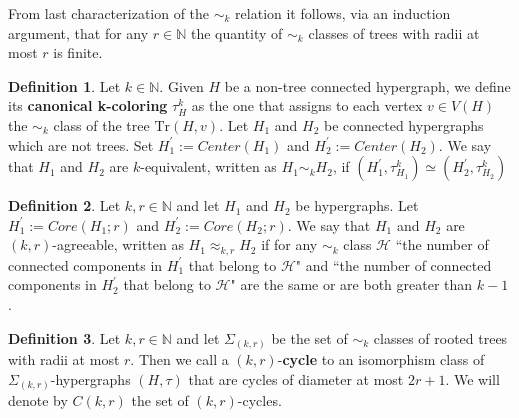 \documentclass[12pt,notitlepage,a4paper]{article}
\theoremstyle{definition}
\newtheorem{definition}{Definition}[section]
\newcommand{\N}{\mathbb{N}}
\newcommand{\Tr}{\mathrm{Tr}}
\begin{document}
From last characterization of the $\sim_k$ relation
it follows, via an induction argument, that for any $r\in \N$ the quantity
of $\sim_k$ classes of trees with radii at most $r$ is finite. \par



\begin{definition} \label{def:sim_general}
	Let $k\in \N$. 
	Given $H$ be a non-tree connected hypergraph, we define
	its \textbf{canonical k-coloring} $\tau^k_{H}$
	as the one that assigns to each vertex $v\in V(H)$ the $\sim_k$ 
	class of the tree
	$\Tr(H,v)$.
	Let $H_1$ and $H_2$ be connected hypergraphs which are not trees.
	Set $H^\prime_1:= Center(H_1)$ and $H^\prime_2:= Center(H_2)$.
	We say that $H_1$ and $H_2$ are $k$-equivalent,
	written as $H_1\sim_k H_2$, if
	$( H^\prime_1,\tau^k_{H_1}) \simeq 
	(H^\prime_2,\tau^k_{H_2})$
\end{definition}

\begin{definition} \label{def:agreeability}
	Let $k,r\in\N$ and let $H_1$ and $H_2$ be hypergraphs.
	Let $H^\prime_1:=Core(H_1;r)$ and $H^\prime_2:=Core(H_2;r)$. 
	We say that $H_1$ and $H_2$ are $(k,r)$-agreeable, written
	as $H_1\approx_{k,r} H_2$ if for any $\sim_k$ class $\mathcal{H}$ 
	``the number of connected
	components in $H^\prime_1$ that belong to $\mathcal{H}$" and
	``the number of connected components in $H^\prime_2$ that belong to 
	$\mathcal{H}$" are the same or are both greater than $k-1$.\par
	
\end{definition}


\begin{definition}
	Let $k,r\in\N$ and let $\Sigma_{(k,r)}$ 
	be the set of $\sim_k$ classes
	of rooted trees with radii at most $r$. Then
	we call a $(k,r)$-\textbf{cycle} to an isomorphism class
	of $\Sigma_{(k,r)}$-hypergraphs 
	$(H,\tau)$ that are cycles of diameter at most $2r+1$.
	We will denote by $C(k,r)$ the set of $(k,r)$-cycles.
\end{definition}
\end{document}
